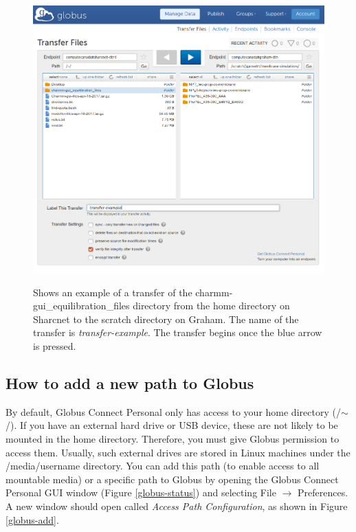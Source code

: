 \documentclass[12pt]{article}
\begin{document}
\begin{figure}[H]
\centering
\caption{Shows an example of a transfer of the charmm-gui\_equilibration\_files directory from the home directory on Sharcnet to the scratch directory on Graham. The name of the transfer is \textit{transfer-example}. The transfer begins once the blue arrow is pressed.}
\includegraphics[width=\textwidth]{globus-ex}
\label{globus-ex}
\end{figure}

\subsection{How to add a new path to Globus}

\quad By default, Globus Connect Personal only has access to your home directory (/$\sim$/). If you have an external hard drive or USB device, these are not likely to be mounted in the home directory. Therefore, you must give Globus permission to access them. Usually, such external drives are stored in Linux machines under the /media/username directory. You can add this path (to enable access to all mountable media) or a specific path to Globus by opening the Globus Connect Personal GUI window (Figure \ref{globus-status}) and selecting File $\rightarrow$ Preferences. A new window should open called \textit{Access Path Configuration}, as shown in Figure \ref{globus-add}.
\end{document}
